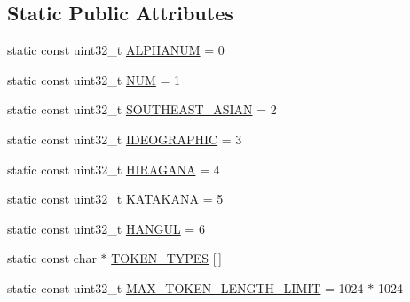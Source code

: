 \subsection*{Static Public Attributes}
\begin{DoxyCompactItemize}
\item 
static const uint32\+\_\+t \mbox{\hyperlink{classlucene_1_1core_1_1analysis_1_1standard_1_1StandardTokenizer_a89e87742cc1d983b876602ddf7c4d823}{A\+L\+P\+H\+A\+N\+UM}} = 0
\item 
static const uint32\+\_\+t \mbox{\hyperlink{classlucene_1_1core_1_1analysis_1_1standard_1_1StandardTokenizer_a0cc5d40f8afa24869c28e26a21ac9a9a}{N\+UM}} = 1
\item 
static const uint32\+\_\+t \mbox{\hyperlink{classlucene_1_1core_1_1analysis_1_1standard_1_1StandardTokenizer_a325a7c52ff70ac6004472ce67d2c195d}{S\+O\+U\+T\+H\+E\+A\+S\+T\+\_\+\+A\+S\+I\+AN}} = 2
\item 
static const uint32\+\_\+t \mbox{\hyperlink{classlucene_1_1core_1_1analysis_1_1standard_1_1StandardTokenizer_a7819d2406e5c2e852740b5123736e66e}{I\+D\+E\+O\+G\+R\+A\+P\+H\+IC}} = 3
\item 
static const uint32\+\_\+t \mbox{\hyperlink{classlucene_1_1core_1_1analysis_1_1standard_1_1StandardTokenizer_a9493d33d2e50179798c89ee7e21de4c8}{H\+I\+R\+A\+G\+A\+NA}} = 4
\item 
static const uint32\+\_\+t \mbox{\hyperlink{classlucene_1_1core_1_1analysis_1_1standard_1_1StandardTokenizer_a3177ce400602ef55696803cdf9cf6bd1}{K\+A\+T\+A\+K\+A\+NA}} = 5
\item 
static const uint32\+\_\+t \mbox{\hyperlink{classlucene_1_1core_1_1analysis_1_1standard_1_1StandardTokenizer_aaafb4ee36c04de9e70b96bfa4b3ffd71}{H\+A\+N\+G\+UL}} = 6
\item 
static const char $\ast$ \mbox{\hyperlink{classlucene_1_1core_1_1analysis_1_1standard_1_1StandardTokenizer_a565064bb569766d9345ab41fdd699cb0}{T\+O\+K\+E\+N\+\_\+\+T\+Y\+P\+ES}} \mbox{[}$\,$\mbox{]}
\item 
static const uint32\+\_\+t \mbox{\hyperlink{classlucene_1_1core_1_1analysis_1_1standard_1_1StandardTokenizer_ad5781b94208ea9b696dc91efac36e80d}{M\+A\+X\+\_\+\+T\+O\+K\+E\+N\+\_\+\+L\+E\+N\+G\+T\+H\+\_\+\+L\+I\+M\+IT}} = 1024 $\ast$ 1024
\end{DoxyCompactItemize}
